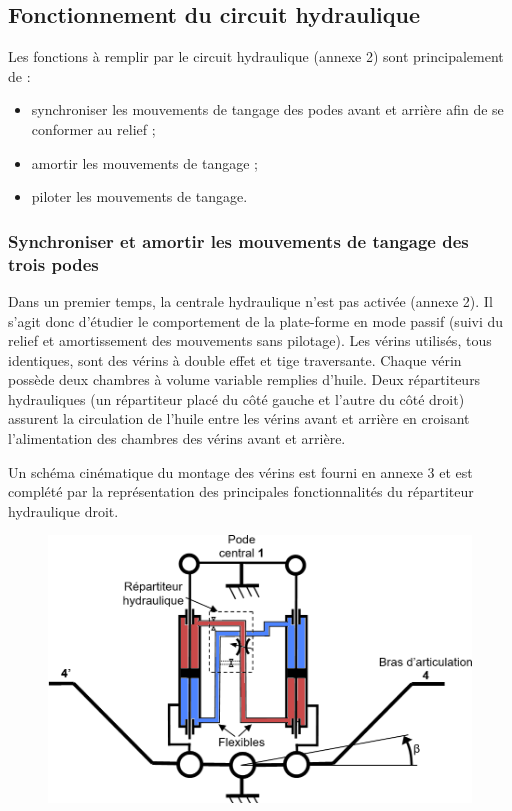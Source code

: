\subsection{Fonctionnement du circuit hydraulique}
\ifprof
\else
Les fonctions à remplir par le circuit hydraulique (annexe 2) sont principalement de :
\begin{itemize}
\item synchroniser les mouvements de tangage des podes avant et arrière afin de se conformer au relief ;
\item amortir les mouvements de tangage ;
\item piloter les mouvements de tangage.
\end{itemize}
\fi

\subsubsection{Synchroniser et amortir les mouvements de tangage des trois podes}
\ifprof
\else

Dans un premier temps, la centrale hydraulique n’est pas activée (annexe 2). Il s’agit donc d’étudier le comportement
de la plate-forme en mode passif (suivi du relief et amortissement des mouvements sans pilotage).
Les vérins utilisés, tous identiques, sont des vérins à double effet et tige traversante. Chaque vérin possède deux
chambres à volume variable remplies d’huile. Deux répartiteurs hydrauliques (un répartiteur placé du côté gauche et
l’autre du côté droit) assurent la circulation de l’huile entre les vérins avant et arrière en croisant l’alimentation des
chambres des vérins avant et arrière.

Un schéma cinématique du montage des vérins est fourni en annexe 3 et est complété par la représentation des
principales fonctionnalités du répartiteur hydraulique droit.
\fi


\ifprof
\begin{corrige}
\begin{figure}[H]
\centering
\includegraphics[width=.8\linewidth]{cor_q_2_3}
\end{figure}
\end{corrige}
\else
\fi

